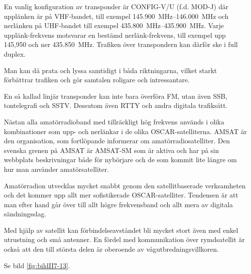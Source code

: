 En vanlig konfiguration av transponder är CONFIG-V/U (f.d. MOD-J) där upplänken
är på VHF-bandet, till exempel \SIrange{145,900}{146,000}{\mega\hertz} och
nerlänken på UHF-bandet till exempel \SIrange{435,800}{435,900}{\mega\hertz}.
Varje upplänk-frekvens motsvarar en bestämd nerlänk-frekvens, till exempel upp
145,950 och ner \SI{435,850}{\mega\hertz}.
Trafiken över transpondern kan därför ske i full duplex.

Man kan då prata och lyssa samtidigt i båda riktningarna, vilket
starkt förbättrar trafiken och gör samtalen roligare och intressantare.

En så kallad linjär transponder kan inte bara överföra FM, utan även SSB,
tontelegrafi och SSTV.
Dessutom även RTTY och andra digitala trafiksätt.

Nästan alla amatörradioband med tillräckligt hög frekvens används i
olika kombinationer som upp- och nerlänkar i de olika OSCAR-satelliterna.
AMSAT är den organisation, som fortlöpande informerar om amatörradiosatelliter.
Den svenska grenen på AMSAT är AMSAT-SM som är aktiva och har på sin webbplats
beskrivningar både för nybörjare och de som kommit lite längre om hur man
använder amatörsatelliter.


Amatörradion utvecklas mycket snabbt genom den satellitbaserade
verksamheten och det kommer upp allt mer sofistikerade OSCAR-satelliter.
Tendensen är att man efter hand går över till allt
högre frekvensband och allt mera av digitala sändningsslag.

Med hjälp av satellit kan förbindelseavståndet bli mycket stort även
med enkel utrustning och små antenner.
En fördel med kommunikation över rymdsatellit är också att den till största
delen är oberoende av vågutbredningsvillkoren.

Se bild \ref{fig:bildII7-13}.
